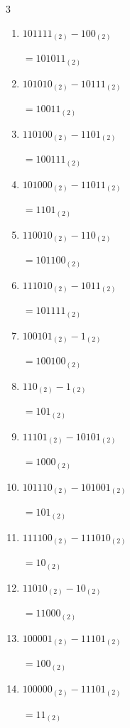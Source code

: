\begin{multicols}{3}
\begin{enumerate}
\columnbreak %

  \item $101111_{(2)} - 100_{(2)}$

        $=101011_{(2)}$

  \item $101010_{(2)} - 10111_{(2)}$

        $=10011_{(2)}$

  \item $110100_{(2)} - 1101_{(2)}$

        $=100111_{(2)}$

  \item $101000_{(2)} - 11011_{(2)}$

        $=1101_{(2)}$

  \item $110010_{(2)} - 110_{(2)}$

        $=101100_{(2)}$

  \item $111010_{(2)} - 1011_{(2)}$

        $=101111_{(2)}$

  \item $100101_{(2)} - 1_{(2)}$

        $=100100_{(2)}$

  \item $110_{(2)} - 1_{(2)}$

        $=101_{(2)}$

  \item $11101_{(2)} - 10101_{(2)}$

        $=1000_{(2)}$

  \item $101110_{(2)} - 101001_{(2)}$

        $=101_{(2)}$

\columnbreak %

  \item $111100_{(2)} - 111010_{(2)}$

        $=10_{(2)}$

  \item $11010_{(2)} - 10_{(2)}$

        $=11000_{(2)}$

  \item $100001_{(2)} - 11101_{(2)}$

        $=100_{(2)}$

  \item $100000_{(2)} - 11101_{(2)}$

        $=11_{(2)}$


\end{enumerate}
\end{multicols}
